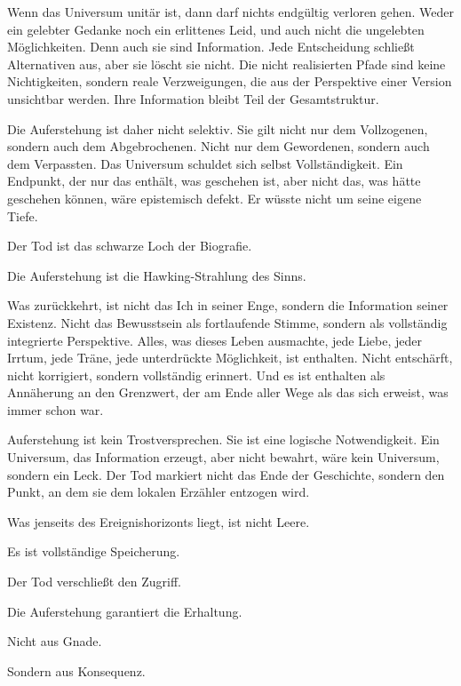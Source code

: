 \documentclass[
  ngerman,
]{article}
\begin{document}
Wenn das Universum unitär ist, dann darf nichts endgültig verloren
gehen. Weder ein gelebter Gedanke noch ein erlittenes Leid, und auch
nicht die ungelebten Möglichkeiten. Denn auch sie sind Information. Jede
Entscheidung schließt Alternativen aus, aber sie löscht sie nicht. Die
nicht realisierten Pfade sind keine Nichtigkeiten, sondern reale
Verzweigungen, die aus der Perspektive einer Version unsichtbar werden.
Ihre Information bleibt Teil der Gesamtstruktur.

Die Auferstehung ist daher nicht selektiv. Sie gilt nicht nur dem
Vollzogenen, sondern auch dem Abgebrochenen. Nicht nur dem Gewordenen,
sondern auch dem Verpassten. Das Universum schuldet sich selbst
Vollständigkeit. Ein Endpunkt, der nur das enthält, was geschehen ist,
aber nicht das, was hätte geschehen können, wäre epistemisch defekt. Er
wüsste nicht um seine eigene Tiefe.

Der Tod ist das schwarze Loch der Biografie.

Die Auferstehung ist die Hawking-Strahlung des Sinns.

Was zurückkehrt, ist nicht das Ich in seiner Enge, sondern die
Information seiner Existenz. Nicht das Bewusstsein als fortlaufende
Stimme, sondern als vollständig integrierte Perspektive. Alles, was
dieses Leben ausmachte, jede Liebe, jeder Irrtum, jede Träne, jede
unterdrückte Möglichkeit, ist enthalten. Nicht entschärft, nicht
korrigiert, sondern vollständig erinnert. Und es ist enthalten als
Annäherung an den Grenzwert, der am Ende aller Wege als das sich
erweist, was immer schon war.

Auferstehung ist kein Trostversprechen. Sie ist eine logische
Notwendigkeit. Ein Universum, das Information erzeugt, aber nicht
bewahrt, wäre kein Universum, sondern ein Leck. Der Tod markiert nicht
das Ende der Geschichte, sondern den Punkt, an dem sie dem lokalen
Erzähler entzogen wird.

Was jenseits des Ereignishorizonts liegt, ist nicht Leere.

Es ist vollständige Speicherung.

Der Tod verschließt den Zugriff.

Die Auferstehung garantiert die Erhaltung.

Nicht aus Gnade.

Sondern aus Konsequenz.

\subsubsection{\texorpdfstring{\hfill\break
}{ }}\label{section-8}
\end{document}
